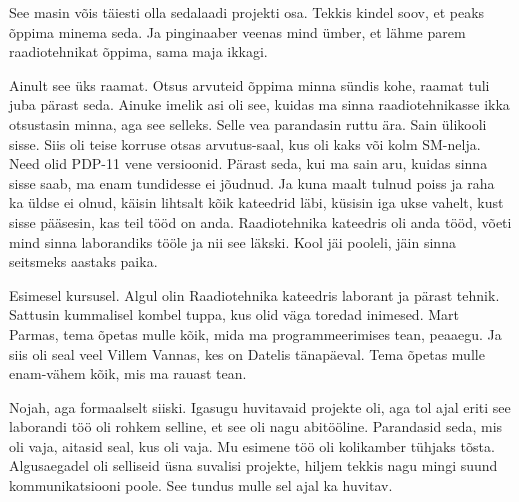
See masin võis täiesti olla sedalaadi projekti osa. Tekkis kindel soov, et peaks õppima minema seda. Ja pinginaaber veenas mind ümber, et lähme parem raadiotehnikat õppima, sama maja ikkagi.


Ainult see üks raamat. Otsus arvuteid õppima minna sündis kohe, raamat tuli juba pärast seda. Ainuke imelik asi oli see, kuidas ma sinna raadiotehnikasse ikka otsustasin minna, aga see selleks. Selle vea parandasin ruttu ära. Sain ülikooli sisse. Siis oli teise korruse otsas arvutus-saal, kus oli kaks või kolm SM-nelja. Need olid PDP-11 vene versioonid. Pärast seda, kui ma sain aru,  kuidas sinna sisse saab, ma enam tundidesse ei jõudnud. Ja kuna maalt tulnud poiss ja raha ka üldse ei olnud, käisin lihtsalt kõik kateedrid läbi, küsisin iga ukse vahelt, kust sisse pääsesin, kas teil tööd on anda. Raadiotehnika kateedris oli anda tööd, võeti mind sinna laborandiks tööle ja nii see läkski. Kool jäi pooleli, jäin sinna seitsmeks aastaks paika.


Esimesel kursusel. Algul olin Raadiotehnika kateedris laborant  ja pärast tehnik. Sattusin kummalisel kombel tuppa, kus olid väga toredad inimesed. Mart Parmas, tema õpetas mulle kõik, mida ma programmeerimises tean, peaaegu. Ja siis oli seal veel Villem Vannas, kes on Datelis tänapäeval. Tema õpetas mulle enam-vähem kõik, mis ma rauast tean.


Nojah, aga formaalselt siiski.  Igasugu huvitavaid projekte oli, aga tol ajal eriti see laborandi töö oli rohkem selline, et see oli nagu abitööline. Parandasid seda, mis oli vaja, aitasid seal, kus oli vaja. Mu esimene töö oli kolikamber tühjaks tõsta.
Algusaegadel oli selliseid üsna suvalisi projekte, hiljem tekkis nagu mingi suund  kommunikatsiooni poole. See tundus mulle sel ajal ka huvitav. 

